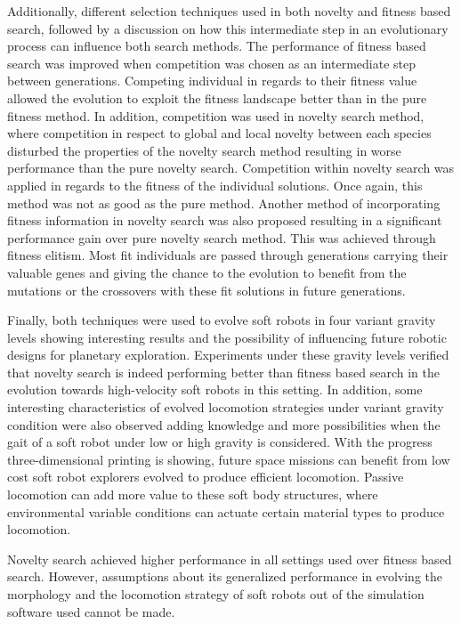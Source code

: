 Additionally, different selection techniques used in both novelty and fitness based search, followed by a discussion on how this intermediate step in an evolutionary process can influence both search methods. The performance of fitness based search was improved when competition was chosen as an intermediate step between generations. Competing individual in regards to their fitness value allowed the evolution to exploit the fitness landscape better than in the pure fitness method. In addition, competition was used in novelty search method, where competition in respect to global and local novelty between each species disturbed the properties of the novelty search method resulting in worse performance than the pure novelty search. Competition within novelty search was applied in regards to the fitness of the individual solutions. Once again, this method was not as good as the pure method. Another method of incorporating fitness information in novelty search was also proposed resulting in a significant performance gain over pure novelty search method. This was achieved through fitness elitism. Most fit individuals are passed through generations carrying their valuable genes and giving the chance to the evolution to benefit from the mutations or the crossovers with these fit solutions in future generations. 

Finally, both techniques were used to evolve soft robots in four variant gravity levels showing interesting results and the possibility of influencing future robotic designs for planetary exploration. Experiments under these gravity levels verified that novelty search is indeed performing better than fitness based search in the evolution towards high-velocity soft robots in this setting. In addition, some interesting characteristics of evolved locomotion strategies under variant gravity condition were also observed adding knowledge and more possibilities when the gait of a soft robot under low or high gravity is considered. With the progress three-dimensional printing is showing, future space missions can benefit from low cost soft robot explorers evolved to produce efficient locomotion. Passive locomotion can add more value to these soft body structures, where environmental variable conditions can actuate certain material types to produce locomotion.

Novelty search achieved higher performance in all settings used over fitness based search. However, assumptions about its generalized performance in evolving the morphology and the locomotion strategy of soft robots out of the simulation software used cannot be made. 

